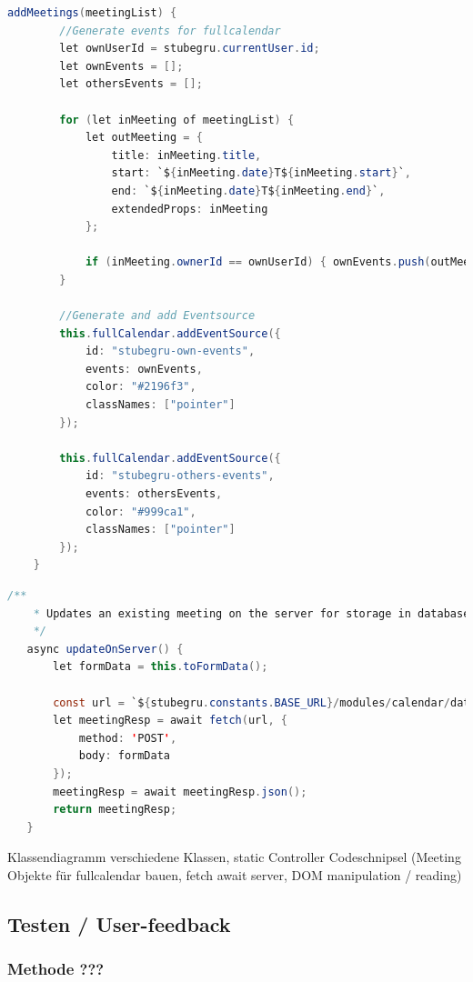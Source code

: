 \documentclass[12pt]{article}
\begin{document}
\begin{lstlisting}[language=Java]
    addMeetings(meetingList) {
        //Generate events for fullcalendar
        let ownUserId = stubegru.currentUser.id;
        let ownEvents = [];
        let othersEvents = [];

        for (let inMeeting of meetingList) {
            let outMeeting = {
                title: inMeeting.title,
                start: `${inMeeting.date}T${inMeeting.start}`,
                end: `${inMeeting.date}T${inMeeting.end}`,
                extendedProps: inMeeting
            };

            if (inMeeting.ownerId == ownUserId) { ownEvents.push(outMeeting); } else { othersEvents.push(outMeeting); }
        }

        //Generate and add Eventsource
        this.fullCalendar.addEventSource({
            id: "stubegru-own-events",
            events: ownEvents,
            color: "#2196f3",
            classNames: ["pointer"]
        });

        this.fullCalendar.addEventSource({
            id: "stubegru-others-events",
            events: othersEvents,
            color: "#999ca1",
            classNames: ["pointer"]
        });
    }
\end{lstlisting}


\begin{lstlisting}[language=Java]
    /**
    * Updates an existing meeting on the server for storage in database
    */
   async updateOnServer() {
       let formData = this.toFormData();

       const url = `${stubegru.constants.BASE_URL}/modules/calendar/dates/update_calendar_date.php`;
       let meetingResp = await fetch(url, {
           method: 'POST',
           body: formData
       });
       meetingResp = await meetingResp.json();
       return meetingResp;
   }
\end{lstlisting}

Klassendiagramm verschiedene Klassen, static Controller Codeschnipsel (Meeting
Objekte für fullcalendar bauen, fetch await server, DOM manipulation / reading)

\subsection{Testen / User-feedback}
\subsubsection{Methode ???}
\end{document}
